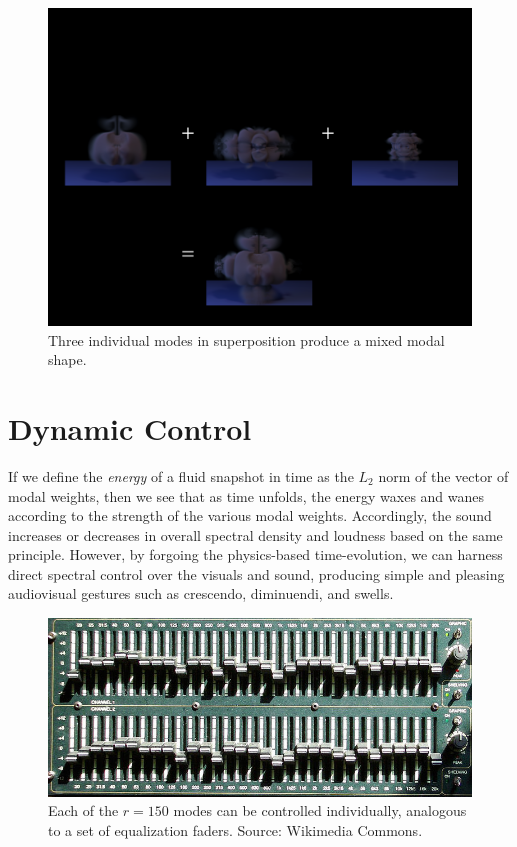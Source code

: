 \begin{figure}
	\centering
	\includegraphics[width=\textwidth]{chap6/figures/superposition.png}
	\caption{Three individual modes in superposition produce a mixed modal shape.}
\label{fig:superposition}
\end{figure}

\section{Dynamic Control}
If we define the {\em energy} of a fluid snapshot in time as the $L_2$ norm of the vector of modal weights, then we see that as time unfolds, the energy waxes and wanes according to the strength
of the various modal weights. Accordingly, the sound increases or decreases in overall spectral density and loudness based on the same principle. However, by forgoing the physics-based time-evolution,
we can harness direct spectral control over the visuals and sound, producing simple and pleasing audiovisual gestures such as crescendo, diminuendi, and swells.

\begin{figure}
	\centering
	\includegraphics[width=\textwidth]{chap6/figures/faders.jpg}
	\caption{Each of the $r = 150$ modes can be controlled individually, analogous to a set of equalization faders. Source: Wikimedia Commons.}
\label{fig:faders}
\end{figure}

